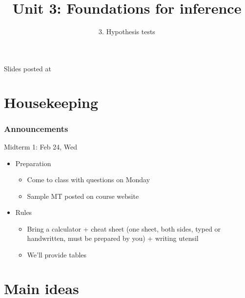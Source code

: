 \documentclass[slidestop,compress,mathserif,12pt,t,professionalfonts,xcolor=table]{beamer}
\title{Unit 3: Foundations for inference}
\subtitle{3. Hypothesis tests}
\author{\CourseName}
\date{}
\institute{\InstituteName}
\begin{document}



\begin{frame}[plain]

\titlepage

\vfill

{\scriptsize {} \hfill Slides posted at  \webURL{\CourseSite}}

\addtocounter{framenumber}{-1} 

\end{frame}


\section{Housekeeping}


\begin{frame}
\frametitle{Announcements}

Midterm 1: Feb 24, Wed

\begin{itemize}

\item Preparation
\begin{itemize}
\item Come to class with questions on Monday
\item Sample MT posted on course website
\end{itemize}

\item Rules
\begin{itemize}
\item Bring a calculator + cheat sheet (one sheet, both sides, typed or handwritten, must be prepared by you) + writing utensil
\item We'll provide tables
\end{itemize}

\end{itemize}

\end{frame}


\section{Main ideas}
\end{document}
